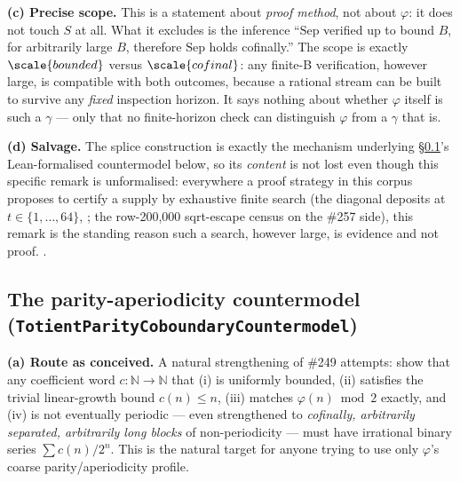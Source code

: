 \textbf{(c) Precise scope.} This is a statement about \emph{proof method},
not about \(\varphi\): it does not touch \(S\) at all. What it excludes is
the inference ``\(\mathrm{Sep}\) verified up to bound \(B\), for arbitrarily
large \(B\), therefore \(\mathrm{Sep}\) holds cofinally.'' The scope is
exactly \(\scale{bounded}\) versus \(\scale{cofinal}\): any finite-B
verification, however large, is compatible with both outcomes, because a
rational stream can be built to survive any \emph{fixed} inspection horizon.
It says nothing about whether \(\varphi\) itself is such a \(\gamma\) — only
that no finite-horizon check can distinguish \(\varphi\) from a \(\gamma\)
that is.

\textbf{(d) Salvage.} The splice construction is exactly the mechanism
underlying \S\ref{sec:parity-countermodel}'s Lean-formalised countermodel
below, so its \emph{content} is not lost even though this specific remark is
unformalised: everywhere a proof strategy in this corpus proposes to certify
a supply by exhaustive finite search (the diagonal deposits at
\(t\in\{1,\dots,64\}\), ; the row-200{,}000 sqrt-escape
census on the \#257 side), this remark is the standing reason such a search,
however large, is evidence and not proof.  
.

\subsection{The parity-aperiodicity countermodel
(\texttt{TotientParityCoboundaryCountermodel})}
\label{sec:parity-countermodel}

\textbf{(a) Route as conceived.} A natural strengthening of \#249 attempts:
show that any coefficient word \(c:\mathbb N\to\mathbb N\) that (i) is
uniformly bounded, (ii) satisfies the trivial linear-growth bound
\(c(n)\le n\), (iii) matches \(\varphi(n)\bmod 2\) exactly, and (iv) is not
eventually periodic — even strengthened to \emph{cofinally, arbitrarily
separated, arbitrarily long blocks} of non-periodicity — must have irrational
binary series \(\sum c(n)/2^n\). This is the natural target for anyone
trying to use only \(\varphi\)'s coarse parity/aperiodicity profile.


